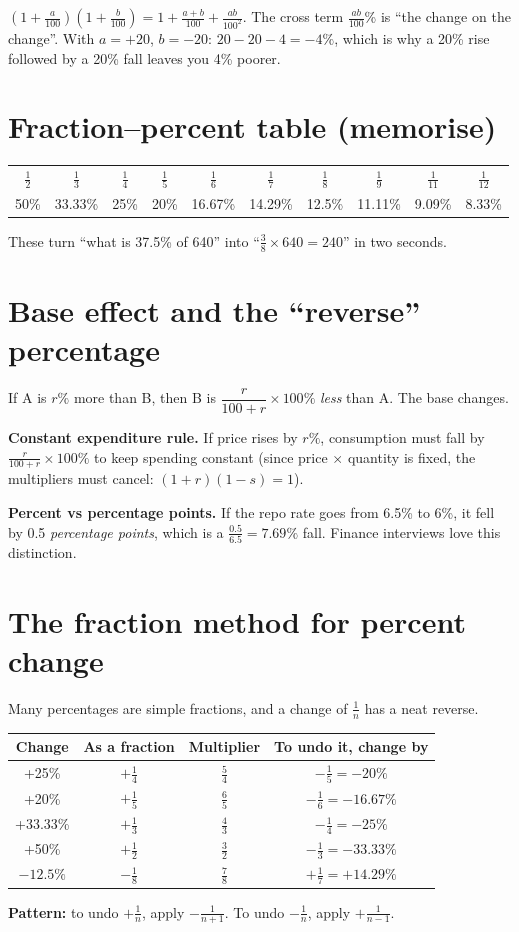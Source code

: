 \documentclass[11pt,a4paper,openany]{report}
\begin{document}
\begin{why}
$(1+\frac a{100})(1+\frac b{100})=1+\frac{a+b}{100}+\frac{ab}{100^2}$. The cross term $\frac{ab}{100}$\% is
``the change on the change''. With $a=+20$, $b=-20$: $20-20-4=-4\%$, which is why a 20\% rise followed by a 20\% fall
leaves you 4\% poorer.
\end{why}

\section{Fraction--percent table (memorise)}
\begin{center}\small
\begin{tabular}{cccccccccc}
\toprule
$\frac12$&$\frac13$&$\frac14$&$\frac15$&$\frac16$&$\frac17$&$\frac18$&$\frac19$&$\frac1{11}$&$\frac1{12}$\\
50\%&33.33\%&25\%&20\%&16.67\%&14.29\%&12.5\%&11.11\%&9.09\%&8.33\%\\
\bottomrule
\end{tabular}
\end{center}
These turn ``what is 37.5\% of 640'' into ``$\frac38\times640=240$'' in two seconds.

\section{Base effect and the ``reverse'' percentage}
If A is $r\%$ more than B, then B is $\dfrac{r}{100+r}\times100\%$ \emph{less} than A. The base changes.

\textbf{Constant expenditure rule.} If price rises by $r\%$, consumption must fall by $\frac{r}{100+r}\times100\%$
to keep spending constant (since price $\times$ quantity is fixed, the multipliers must cancel: $(1+r)(1-s)=1$).

\textbf{Percent vs percentage points.} If the repo rate goes from 6.5\% to 6\%, it fell by 0.5 \emph{percentage points},
which is a $\frac{0.5}{6.5}=7.69\%$ fall. Finance interviews love this distinction.
\section{The fraction method for percent change}
Many percentages are simple fractions, and a change of $\frac1n$ has a neat reverse.
\begin{center}\small
\begin{tabular}{cc|cc}
\toprule
Change & As a fraction & Multiplier & To undo it, change by\\\midrule
+25\% & $+\frac14$ & $\frac54$ & $-\frac15=-20\%$\\
+20\% & $+\frac15$ & $\frac65$ & $-\frac16=-16.67\%$\\
+33.33\% & $+\frac13$ & $\frac43$ & $-\frac14=-25\%$\\
+50\% & $+\frac12$ & $\frac32$ & $-\frac13=-33.33\%$\\
$-12.5\%$ & $-\frac18$ & $\frac78$ & $+\frac17=+14.29\%$\\
\bottomrule
\end{tabular}
\end{center}
\textbf{Pattern:} to undo $+\frac1n$, apply $-\frac1{n+1}$. To undo $-\frac1n$, apply $+\frac1{n-1}$.
\end{document}
